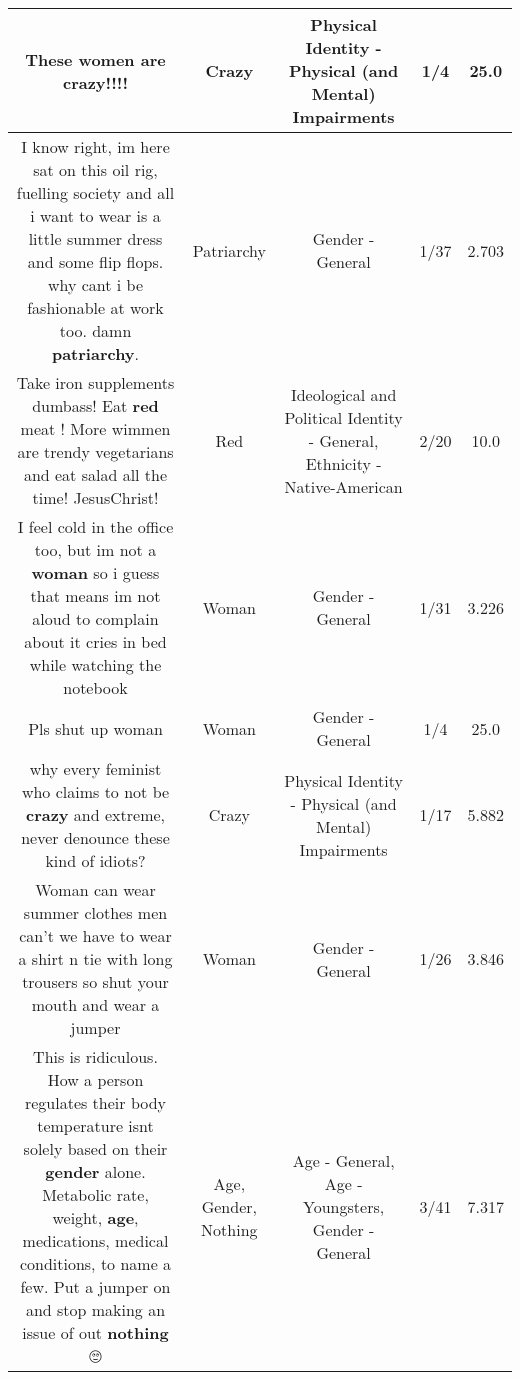 \documentclass[11pt]{article}
\newlength\mylength
\begin{document}
\begin{center}
\begin{longtable}{|C{.65\mylength}|C{.30\mylength}|C{.12\mylength}|C{.12\mylength}|C{.12\mylength}|}
  \small These women are \textbf{crazy}!!!!\normalsize   & Crazy & Physical Identity - Physical (and Mental) Impairments & 1/4 & 25.0 \\  \hline
  \small I know right, im here sat on this oil rig, fuelling society and all i want to wear is a little summer dress and some flip flops. why cant i be fashionable at work too. damn \textbf{patriarchy}.\normalsize   & Patriarchy & Gender - General & 1/37 & 2.703 \\  \hline
  \small Take iron supplements dumbass! Eat \textbf{r\textbf{ed}} meat !  More wimmen are trendy vegetarians and eat salad all the time! JesusChrist!\normalsize   & Red &  Ideological and Political Identity - General, Ethnicity - Native-American & 2/20 & 10.0 \\  \hline
  \small I feel cold in the office too, but im not a \textbf{woman} so i guess that means im not aloud to complain about it cries in bed while watching the notebook\normalsize   & Woman & Gender - General & 1/31 & 3.226 \\  \hline
  \small Pls shut up woman\normalsize   & Woman & Gender - General & 1/4 & 25.0 \\  \hline
  \small why every feminist who claims to not be \textbf{crazy} and extreme, never denounce these kind of idiots?\normalsize   & Crazy & Physical Identity - Physical (and Mental) Impairments & 1/17 & 5.882 \\  \hline
  \small Woman can wear summer clothes men can't we have to wear a shirt n tie with long trousers so shut your mouth and wear a jumper\normalsize   & Woman & Gender - General & 1/26 & 3.846 \\  \hline
  \small This is ridiculous. How a person regulates their body temperature isnt solely based on their \textbf{gender} alone. Metabolic rate, weight, \textbf{age}, medications, medical conditions, to name a few. Put a jumper on and stop making an issue of out \textbf{nothing} 🙄\normalsize   & Age, Gender, Nothing & Age - General, Age - Youngsters, Gender - General & 3/41 & 7.317 \\  \hline

\end{longtable}
\end{center}
\end{document}
